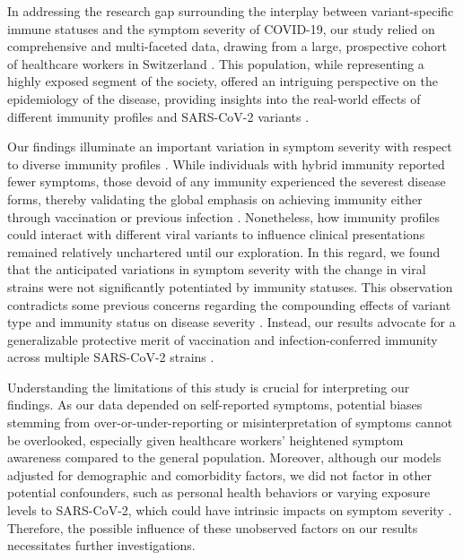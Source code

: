 \documentclass[11pt]{article}
\begin{document}
In addressing the research gap surrounding the interplay between variant-specific immune statuses and the symptom severity of COVID-19, our study relied on comprehensive and multi-faceted data, drawing from a large, prospective cohort of healthcare workers in Switzerland \cite{Hall2022ProtectionAS,Lipsitch2021SARSCoV2BI,Harvey2021SARSCoV2VS}. This population, while representing a highly exposed segment of the society, offered an intriguing perspective on the epidemiology of the disease, providing insights into the real-world effects of different immunity profiles and SARS-CoV-2 variants \cite{Lang2023InfluenzaVB,Piccoli2020RiskAA,Schwappach2018SpeakUC}.

Our findings illuminate an important variation in symptom severity with respect to diverse immunity profiles \cite{Goldberg2022ProtectionAW}. While individuals with hybrid immunity reported fewer symptoms, those devoid of any immunity experienced the severest disease forms, thereby validating the global emphasis on achieving immunity either through vaccination or previous infection \cite{Hall2022ProtectionAS, Sen2021PredictingCS}. Nonetheless, how immunity profiles could interact with different viral variants to influence clinical presentations remained relatively unchartered until our exploration. In this regard, we found that the anticipated variations in symptom severity with the change in viral strains were not significantly potentiated by immunity statuses. This observation contradicts some previous concerns regarding the compounding effects of variant type and immunity status on disease severity \cite{Carabelli2023SARSCoV2VB, Lin2021TheDS}. Instead, our results advocate for a generalizable protective merit of vaccination and infection-conferred immunity across multiple SARS-CoV-2 strains \cite{Harvey2021SARSCoV2VS, Carabelli2023SARSCoV2VB}.

Understanding the limitations of this study is crucial for interpreting our findings. As our data depended on self-reported symptoms, potential biases stemming from over-or-under-reporting or misinterpretation of symptoms cannot be overlooked, especially given healthcare workers' heightened symptom awareness compared to the general population. Moreover, although our models adjusted for demographic and comorbidity factors, we did not factor in other potential confounders, such as personal health behaviors or varying exposure levels to SARS-CoV-2, which could have intrinsic impacts on symptom severity \cite{Kim2020RiskFO}. Therefore, the possible influence of these unobserved factors on our results necessitates further investigations.
\end{document}

